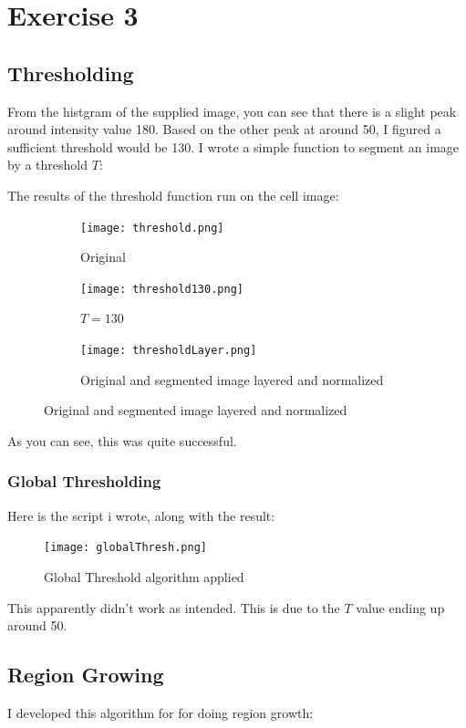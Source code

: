 \documentclass{article}
\begin{document}
\section{Exercise 3}
\subsection{Thresholding}
From the histgram of the supplied image, you can see that there is a slight peak around intensity value 180. Based on the other peak at around 50, I figured a sufficient threshold would be 130. I wrote a simple function to segment an image by a threshold $T$:


The results of the threshold function run on the cell image:
\begin{figure}[h]
	\centering
	\begin{subfigure}[t]{0.3\textwidth}
		\texttt{[image: threshold.png]}
		\caption{Original}
		\label{fig:threshold.png}
	\end{subfigure}
	\begin{subfigure}[t]{0.3\textwidth}
		\texttt{[image: threshold130.png]}
		\caption{$T = 130$}
		\label{fig:threshold130.png}
	\end{subfigure}
	\begin{subfigure}[t]{0.3\textwidth}
		\texttt{[image: thresholdLayer.png]}
		\caption{Original and segmented image layered and normalized}
		\label{fig:thresholdLayer.png}
	\end{subfigure}
\end{figure}

As you can see, this was quite successful.

\newpage
\subsubsection*{Global Thresholding}
Here is the script i wrote, along with the result:



\begin{figure}[h]
	\centering
	\texttt{[image: globalThresh.png]}
	\caption{Global Threshold algorithm applied}
\end{figure}
This apparently didn't work as intended. This is due to the $T$ value ending up around 50.

\newpage
\subsection{Region Growing}
I developed this algorithm for for doing region growth:

\end{document}

